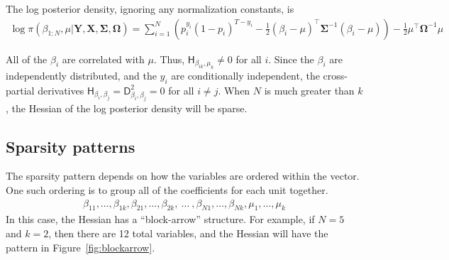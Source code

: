 \documentclass[article]{jss}\usepackage[]{graphicx}\usepackage[]{color}
\newcommand{\parD}[3]{\mathsf{D}^{#1}_{#2}#3}
\newcommand{\hess}[2]{\mathsf{H}_{#1}#2}
\newcommand{\Mat}[1]{\mathbf{#1}}
\begin{document}
The log posterior density, ignoring any normalization constants, is
\begin{align}
  \label{eq:LPD}
  \log \pi(\beta_{1:N},\mu|\Mat{Y}, \Mat{X}, \Mat{\Sigma},\Mat{\Omega})=\sum_{i=1}^N\left(p_i^{y_i}(1-p_i)^{T-y_i}
  -\frac{1}{2}\left(\beta_i-\mu\right)^\top\Mat{\Sigma}^{-1}\left(\beta_i-\mu\right)\right)
-\frac{1}{2}\mu^\top\Mat{\Omega}^{-1}\mu
\end{align}

All of the $\beta_i$ are correlated with
$\mu$.  Thus, $\hess{\beta_{ik},\mu_k}{}\neq 0$ for all $i$. Since the $\beta_i$ are independently distributed, and the $y_i$ are
conditionally independent, the cross-partial derivatives
$\hess{\beta_i,\beta_j}{}=\parD{2}{\beta_i, \beta_j}{}=0$ for all $i\neq
j$.  When $N$ is much greater than $k$, the Hessian of the log
posterior density will be sparse.


\subsection[Sparsity patterns]{Sparsity patterns}\label{sec:sparsity}



The sparsity pattern depends on how the variables are
ordered within the vector. One such ordering is to group all of the
coefficients for each unit together.
\begin{align}
\beta_{11},\dotsc,\beta_{1k},\beta_{21},\dotsc,\beta_{2k},~\dotsc~,\beta_{N1},\dotsc,\beta_{Nk},\mu_1,\dotsc,\mu_k
\end{align}
In this case, the Hessian has a ``block-arrow'' structure.  For example,
if $N=5$ and $k=2$, then there are 12 total
variables, and the Hessian will have the pattern in Figure~\ref{fig:blockarrow}.
\end{document}
